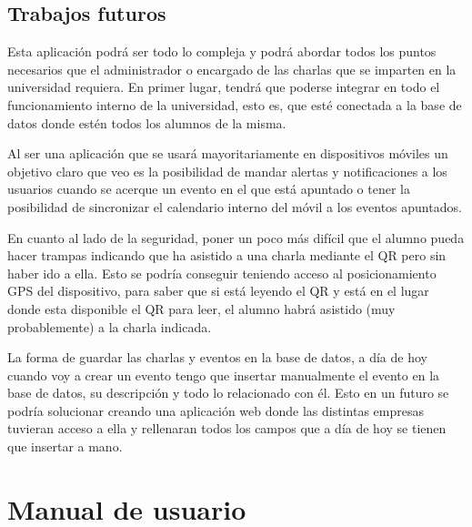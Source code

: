\documentclass[a4paper, 12pt]{book}
\begin{document}
\section{Trabajos futuros}
\label{sec:trabajos_futuros}

Esta aplicación podrá ser todo lo compleja y podrá abordar todos los puntos necesarios que el administrador o encargado de las charlas que se imparten en la  universidad requiera. 
En primer lugar, tendrá que poderse integrar en todo el funcionamiento interno de la universidad, esto es, que esté conectada a la base de datos  donde estén todos los alumnos de la misma.

Al ser una aplicación que se usará mayoritariamente en dispositivos móviles un objetivo claro que veo es la posibilidad de mandar alertas y notificaciones a los usuarios cuando se acerque un evento en el que está apuntado o tener la posibilidad de sincronizar el calendario interno del móvil a los eventos apuntados.

En cuanto al lado de la seguridad, poner un poco más difícil que el alumno pueda hacer trampas indicando que ha asistido a una charla mediante el QR pero sin haber ido a ella. Esto se podría conseguir teniendo acceso al posicionamiento GPS del dispositivo, para saber que si está leyendo el QR y está en el lugar donde esta disponible el QR para leer, el alumno habrá asistido (muy probablemente) a la charla indicada.


La forma de guardar las charlas y eventos en la base de datos, a día de hoy cuando voy a crear un evento tengo que insertar manualmente el evento en la base de datos, su descripción y todo lo relacionado con él. Esto en un futuro se podría solucionar creando una aplicación web donde las distintas empresas tuvieran acceso a ella y rellenaran todos los campos que a día de hoy se tienen que insertar a mano.



\cleardoublepage
\appendix
\chapter{Manual de usuario}
\label{app:manual}
\end{document}
